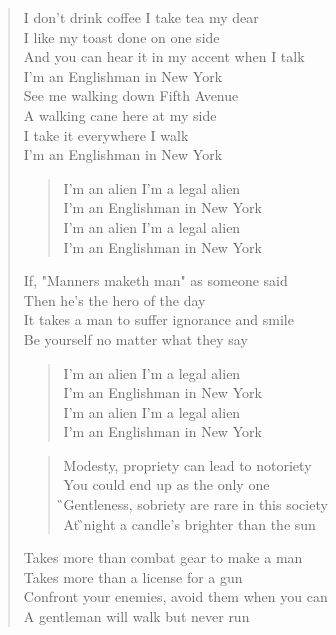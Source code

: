\documentclass[9pt,a4paper,oneside, onecolumn]{article}
\begin{document}
\begin{verse}
\Em{}I don't drink \A{}coffee I take \Hm{}tea my dear\Hms{}\\
I like my toast done on one side\\
And you can hear it in my accent when I talk\\
I'm an Englishman in New York\\

See me walking down Fifth Avenue\\
A walking cane here at my side\\
I take it everywhere I walk\\
I'm an Englishman in New York\\

\begin{verse}
I'm an alien I'm a legal alien\\
I'm an Englishman in New York\\
I'm an alien I'm a legal alien\\
I'm an Englishman in New York\\
\end{verse}

If, "Manners maketh man" as someone said\\
Then he's the hero of the day\\
It takes a man to suffer ignorance and smile\\
Be yourself no matter what they say\\

\begin{verse}
I'm an alien I'm a legal alien\\
I'm an Englishman in New York\\
I'm an alien I'm a legal alien\\
I'm an Englishman in New York\\
\end{verse}

\begin{verse}
\D{}Modesty, propriety can \A{}lead to noto\As{}riety\\
\Hm{}You could end \Hms{}up as the only \Fis{}one\\
\G{}Gentleness, sobriety are \A{}rare in this society\\
At \G{}night a candle's brighter than the \Hm{}sun\\
\end{verse}

Takes more than combat gear to make a man\\
Takes more than a license for a gun\\
Confront your enemies, avoid them when you can\\
A gentleman will walk but never run\\


\end{verse}
\end{document}

